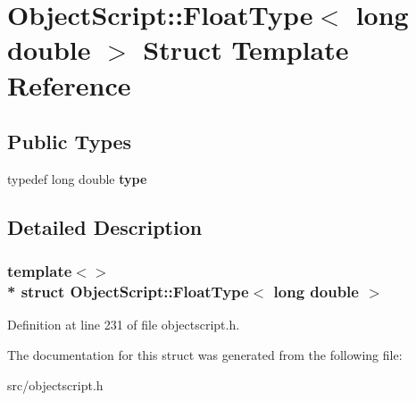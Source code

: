 \hypertarget{struct_object_script_1_1_float_type_3_01long_01double_01_4}{}\section{Object\+Script\+:\+:Float\+Type$<$ long double $>$ Struct Template Reference}
\label{struct_object_script_1_1_float_type_3_01long_01double_01_4}
\subsection*{Public Types}
\begin{DoxyCompactItemize}
\item 
typedef long double {\bfseries type}\hypertarget{struct_object_script_1_1_float_type_3_01long_01double_01_4_aa78f14fc86dc7378c807a62804681196}{}\label{struct_object_script_1_1_float_type_3_01long_01double_01_4_aa78f14fc86dc7378c807a62804681196}

\end{DoxyCompactItemize}


\subsection{Detailed Description}
\subsubsection*{template$<$$>$\\*
struct Object\+Script\+::\+Float\+Type$<$ long double $>$}



Definition at line 231 of file objectscript.\+h.



The documentation for this struct was generated from the following file\+:\begin{DoxyCompactItemize}
\item 
src/objectscript.\+h\end{DoxyCompactItemize}
